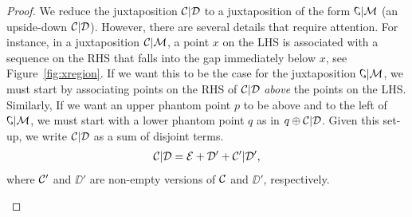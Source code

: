 \documentclass[12pt, a4paper, twoside]{report}
\begin{document}
\begin{proof}
We reduce the juxtaposition $\mathcal{C}|\mathcal{D}$ to a juxtaposition of the form $\reflectbox{\rotatebox[origin=c]{180}{\C}}|\M$ (an upside-down $\mathcal{C}|\mathcal{D}$). However, there are several details that require attention. For instance, in a juxtaposition $\mathcal{C}|\mathcal{M}$, a point $x$ on the LHS is associated with a sequence on the RHS that falls into the gap immediately below $x$, see Figure~\ref{fig:xregion}. If we want this to be the case for the juxtaposition $\reflectbox{\rotatebox[origin=c]{180}{\C}}|\M$, we must start by associating points on the RHS of $\mathcal{C}|\mathcal{D}$ \emph{above} the points on the LHS. Similarly, If we want an upper phantom point $p$ to be above and to the left of $\reflectbox{\rotatebox[origin=c]{180}{\C}}|\M$, we must start with a lower phantom point $q$ as in $q \oplus \mathcal{C}|\mathcal{D}$. Given this set-up, we write $\mathcal{C}|\mathcal{D}$ as a sum of disjoint terms. 
\begin{align}
  \mathcal{C}|\mathcal{D} = \mathcal{E} + \mathcal{D}' + \mathcal{C}'|\mathcal{D}',
\label{eq:decrease_objective}
\end{align}
where $\mathcal{C}'$ and $\DD'$ are non-empty versions of $\mathcal{C}$ and $\DD'$, respectively.

\begin{figure}[!ht]
  \centering
\end{figure}
\end{proof}
\end{document}
